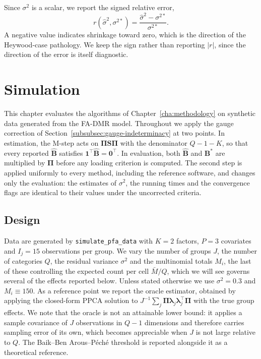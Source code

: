 Since $\sigma^2$ is a scalar, we report the signed relative error,
\begin{equation}
    r(\hat\sigma^2, \sigma^{2\ast}) = \frac{\hat\sigma^2 - \sigma^{2\ast}}{\sigma^{2\ast}}.
    \label{eq:sigma-criterion}
\end{equation}
A negative value indicates shrinkage toward zero, which is the direction of the Heywood-case pathology. We keep the sign rather than reporting $|r|$, since the direction of the error is itself diagnostic.

\iffalse
\section{Simulation}
\label{sec:simulation}

This chapter evaluates the algorithms of Chapter~\ref{cha:methodology} on synthetic data generated from the FA-DMR model. Throughout we apply the gauge correction of Section~\ref{subsubsec:gauge-indeterminacy} at two points. In estimation, the M-step acts on $\bm{\Pi}\mathbf{S}\bm{\Pi}$ with the denominator $Q-1-K$, so that every reported $\hat{\mathbf{B}}$ satisfies $\mathbf{1}^{\top}\hat{\mathbf{B}}=\mathbf{0}^{\top}$. In evaluation, both $\hat{\mathbf{B}}$ and $\mathbf{B}^{\ast}$ are multiplied by $\bm{\Pi}$ before any loading criterion is computed. The second step is applied uniformly to every method, including the reference software, and changes only the evaluation: the estimates of $\sigma^{2}$, the running times and the convergence flags are identical to their values under the uncorrected criteria.

\subsection{Design}
\label{subsec:sim-design}

Data are generated by \texttt{simulate\_pfa\_data} with $K=2$ factors, $P=3$ covariates and $I_j=15$ observations per group. We vary the number of groups $J$, the number of categories $Q$, the residual variance $\sigma^{2}$ and the multinomial totals $M_i$, the last of these controlling the expected count per cell $\bar{M}/Q$, which we will see governs several of the effects reported below. Unless stated otherwise we use $\sigma^{2}=0.3$ and $M_i\equiv150$. As a reference point we report the oracle estimator, obtained by applying the closed-form PPCA solution to $J^{-1}\sum_j \bm{\Pi}\bm{\lambda}_j\bm{\lambda}_j^{\top}\bm{\Pi}$ with the true group effects. We note that the oracle is not an attainable lower bound: it applies a sample covariance of $J$ observations in $Q-1$ dimensions and therefore carries sampling error of its own, which becomes appreciable when $J$ is not large relative to $Q$. The Baik--Ben Arous--P\'ech\'e threshold is reported alongside it as a theoretical reference.

